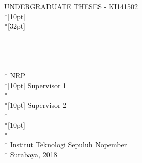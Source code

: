 \newpage
	\sffamily
	\thispagestyle{empty}
	{\noindent UNDERGRADUATE THESES - KI141502 } \\*[10pt]
	{\large\textbf{\MakeUppercase{\juduleng}}} \\*[32pt]
	\\
	\\
	\\
	\\
	\MakeUppercase{\penulis} \\*
	NRP \nrplama \\*[10pt]
	Supervisor 1 \\*
	\pembimbingsatu \\*[10pt]
	Supervisor 2 \\*
	\pembimbingdua \\*[10pt]
	\MakeUppercase{\jurusanbarueng} \\*
	\fakultasbarueng \\*
	Institut Teknologi Sepuluh Nopember \\*
	Surabaya, 2018
	\rmfamily
	\normalsize
	\restoregeometry
	\color{black}
	\cleardoublepage
